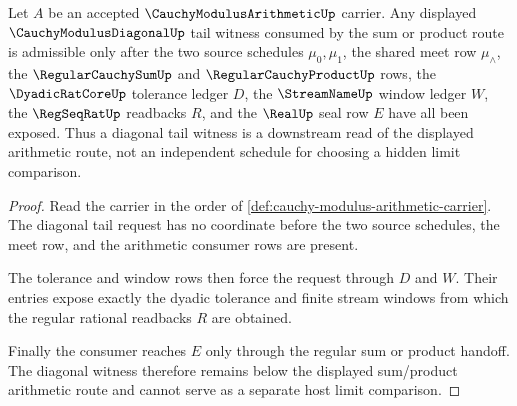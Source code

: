 \begin{theorem}
\label{thm:cauchy-modulus-arithmetic-diagonal-dominates-sum-product}
Let $A$ be an accepted $\CauchyModulusArithmeticUp$ carrier. Any displayed
$\CauchyModulusDiagonalUp$ tail witness consumed by the sum or product route
is admissible only after the two source schedules $\mu_0,\mu_1$, the shared
meet row $\mu_{\wedge}$, the $\RegularCauchySumUp$ and
$\RegularCauchyProductUp$ rows, the $\DyadicRatCoreUp$ tolerance ledger $D$,
the $\StreamNameUp$ window ledger $W$, the $\RegSeqRatUp$ readbacks $R$, and
the $\RealUp$ seal row $E$ have all been exposed. Thus a diagonal tail
witness is a downstream read of the displayed arithmetic route, not an
independent schedule for choosing a hidden limit comparison.
\end{theorem}
\begin{proof}
Read the carrier in the order of
\autoref{def:cauchy-modulus-arithmetic-carrier}. The diagonal tail request has
no coordinate before the two source schedules, the meet row, and the arithmetic
consumer rows are present.

The tolerance and window rows then force the request through $D$ and $W$.
Their entries expose exactly the dyadic tolerance and finite stream windows
from which the regular rational readbacks $R$ are obtained.

Finally the consumer reaches $E$ only through the regular sum or product
handoff. The diagonal witness therefore remains below the displayed
sum/product arithmetic route and cannot serve as a separate host limit
comparison.
\end{proof}

